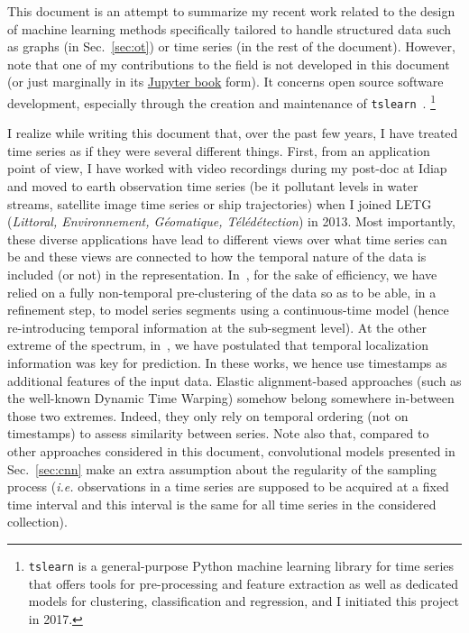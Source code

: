 This document is an attempt to summarize my recent work related to the design of
machine learning methods specifically tailored to handle structured data such
as graphs (in Sec.~\ref{sec:ot}) or time series (in the rest of the
document).
However, note that one of my contributions to the field is not developed in
this document (or just marginally in its
\href{https://rtavenar.github.io/hdr/}{Jupyter book} form). It concerns open
source software development, especially through the creation and
maintenance of \texttt{tslearn}~\cite{tslearn}.%
\footnote{\texttt{tslearn} is a general-purpose Python machine learning library
    for time series that offers tools for pre-processing and feature extraction
    as well as dedicated models for clustering, classification and regression,
    and I initiated this project in 2017.}

I realize while writing this document that, over the past few years, I
have treated time series as if they were several different things.
First, from an application point of view, I have worked with video recordings
during my post-doc at Idiap and moved to earth observation time series
(be it pollutant levels in water streams, satellite image time series or ship
trajectories) when I joined LETG (\emph{Littoral, Environnement, Géomatique,
Télédétection}) in 2013.
Most importantly, these diverse applications have lead to different views
over what time series can be and these views are connected to how the temporal
nature of the data is included (or not) in the representation.
In~\cite{gloaguen2020}, for the sake of efficiency, we have relied on a fully
non-temporal pre-clustering of the data so as to be able, in a refinement step,
to model series segments using a continuous-time model (hence re-introducing
temporal information at the sub-segment level).
At the other extreme of the spectrum,
in~\cite{guilleme:hal-02513295,tavenard:halshs-01561461},
we have postulated that temporal localization information was key for
prediction.
In these works, we hence use timestamps as additional features of the
input data.
Elastic alignment-based approaches (such as the well-known Dynamic Time Warping)
somehow belong somewhere in-between those two extremes.
Indeed, they only rely on temporal ordering
(not on timestamps) to assess similarity between series.
Note also that, compared to other approaches considered in this document,
convolutional models presented in Sec.~\ref{sec:cnn} make an
extra assumption about the regularity of the sampling process (\emph{i.e.}
observations in a time series are supposed to be acquired at a fixed time
interval and this interval is the same for all time series in the considered
collection).

